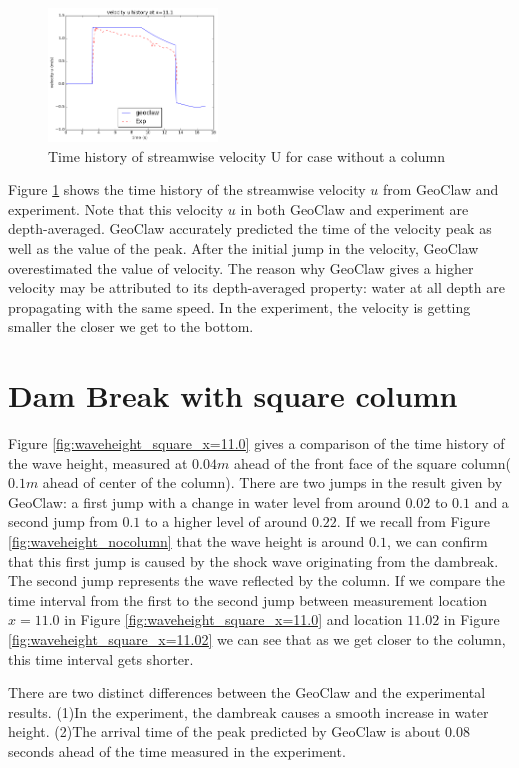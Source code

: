 \documentclass[11pt]{article}
\begin{document}
\begin{figure}[h!]
    \centering
    \includegraphics[width=0.4\textwidth]{./plots/velocityU_nocolumn}
    \caption{Time history of streamwise velocity U for case without a column}
    \label{fig:velocityU_nocolumn}
\end{figure}
Figure \ref{fig:velocityU_nocolumn} shows the time history of the streamwise velocity $u$ from GeoClaw and experiment. 
Note that this velocity $u$ in both GeoClaw and experiment are depth-averaged. 
GeoClaw accurately predicted the time of the velocity peak as well as the value of the peak. 
After the initial jump in the velocity, GeoClaw overestimated the value of velocity.
The reason why GeoClaw gives a higher velocity may be attributed to its depth-averaged property: water at all depth are propagating with the same speed. In the experiment, the velocity is getting smaller the closer we get to the bottom. 

\section{Dam Break with square column}\label{Sec:Square}
Figure \ref{fig:waveheight_square_x=11.0} gives a comparison of the time history of the wave height, measured at $0.04m$ ahead of the front face of the square column($0.1m$ ahead of center of the column).
There are two jumps in the result given by GeoClaw: a first jump with a change in water level from around $0.02$ to $0.1$ and a second jump from $0.1$ to a higher level of around $0.22$.
If we recall from Figure \ref{fig:waveheight_nocolumn} that the wave height is around $0.1$, we can confirm that this first jump is caused by the shock wave originating from the dambreak. The second jump represents the wave reflected by the column.  
If we compare the time interval from the first to the second jump between measurement location $x=11.0$ in Figure \ref{fig:waveheight_square_x=11.0} and location $11.02$ in Figure \ref{fig:waveheight_square_x=11.02} we can see that as we get closer to the column, this time interval gets shorter.
\par
There are two distinct differences between the GeoClaw and the experimental results. (1)In the experiment, the dambreak causes a smooth increase in water height. (2)The arrival time of the peak predicted by GeoClaw is about $0.08$ seconds ahead of the time measured in the experiment.  
\par
\end{document}
